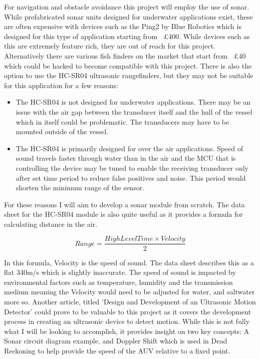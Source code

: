 \documentclass[11pt,a4paper,titlepage]{report}
\begin{document}
	For navigation and obstacle avoidance this project will employ the use of sonar. While prefabricated sonar units designed for underwater applications exist, these are often expensive with devices such as the Ping2 by Blue Robotics\cite{PING2} which is designed for this type of application starting from ~£400. While devices such as this are extremely feature rich, they are out of reach for this project. Alternatively there are various fish finders on the market that start from ~£40 which could be hacked to become compatible with this project. There is also the option to use the HC-SR04\cite{HC-SR04} ultrasonic rangefinders, but they may not be suitable for this application for a few reasons:
	\begin{itemize}
		\item The HC-SR04 is not designed for underwater applications. There may be an issue with the air gap between the transducer itself and the hull of the vessel which in itself could be problematic. The transducers may have to be mounted outside of the vessel. 
		\item The HC-SR04 is primarily designed for over the air applications. Speed of sound travels faster through water than in the air and the MCU that is controlling the device may be tuned to enable the receiving transducer only after set time period to reduce false positives and noise. This period would shorten the minimum range of the sensor. 
	\end{itemize} 
	
	For these reasons I will aim to develop a sonar module from scratch. The data sheet for the HC-SR04 module is also quite useful as it provides a formula for calculating distance in the air.
	
	$$
	Range=\frac{High Level Time \times Velocity}{2}
	$$\cite{HC-SR04}
	
	In this formula, Velocity is the speed of sound. The data sheet describes this as a flat 340\unit{\meter}/\unit{\second} which is slightly inaccurate. The speed of sound is impacted by environmental factors such as temperature, humidity and the transmission medium meaning the Velocity would need to be adjusted for water, and saltwater more so\cite{SOS_CALC}. Another article, titled 'Design and Development of an Ultrasonic Motion Detector'\cite{USONIC_MOTION_DET} could prove to be valuable to this project as it covers the development process in creating an ultrasonic device to detect motion. While this is not fully what I will be looking to accomplish, it provides insight on two key concepts: A Sonar circuit diagram example, and Doppler Shift which is used in Dead Reckoning to help provide the speed of the AUV relative to a fixed point. 
	 
\end{document}

